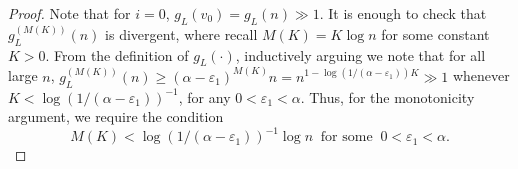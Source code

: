 \documentclass[letterpaper,11pt,reqno]{amsart}
\theoremstyle{definition}
\renewcommand{\leq}{\leqslant}
\renewcommand{\geq}{\geqslant}
\newcommand{\eps}{\varepsilon}
\begin{document}
\begin{proof}
Note that for $i=0$, $g_L(v_0)=g_L(n)\gg1$. It is enough to check that $g_L^{(M(K))}(n)$ is divergent, where recall $M(K)=K \log n$ for some constant $K>0$. From the definition of $g_{L}(\cdot)$, inductively arguing we note that for all large $n$, $g_L^{(M(K))}(n)\geq (\alpha-\eps_1)^{M(K)}n=n^{1-\log(1/(\alpha-\eps_1))K}\gg 1$ whenever $K<\log(1/(\alpha-\eps_1))^{-1}$, for any $0<\eps_1<\alpha$. Thus, for the monotonicity argument, we require the condition
\begin{equation}\label{eq:monotone_condition}
    M(K)<\log(1/(\alpha-\eps_1))^{-1} \log n\;\;\text{for some}\;\;0<\eps_1<\alpha.
\end{equation}




\end{proof}
\end{document}
